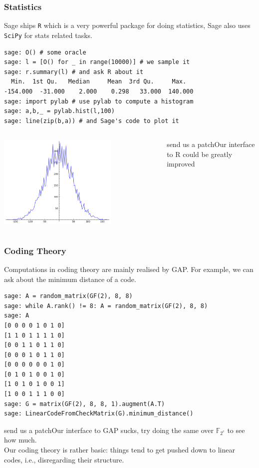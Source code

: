 \documentclass[9pt]{beamer}
\newcommand{\field}[1]{\ensuremath{\mathbb{#1}}}
\newcommand{\F}{\ensuremath{\field{F}}}
\newcommand{\patchit}[1]{\begin{block}{send us a patch}#1\end{block}}
\begin{document}
\begin{frame}[fragile]
\frametitle{Statistics}
Sage ships {\tt R} which is a very powerful package for doing statistics, Sage also uses {\tt SciPy} for stats related tasks.

\begin{lstlisting}
sage: O() # some oracle
sage: l = [O() for _ in range(10000)] # we sample it
sage: r.summary(l) # and ask R about it
  Min.  1st Qu.   Median     Mean  3rd Qu.     Max.
-154.000  -31.000    2.000    0.298   33.000  140.000
sage: import pylab # use pylab to compute a histogram
sage: a,b,_ = pylab.hist(l,100)
sage: line(zip(b,a)) # and Sage's code to plot it
\end{lstlisting}

\begin{columns}
\centering
\includegraphics[width=0.7\textwidth]{gaussian.png}
\patchit{Our interface to R could be greatly improved}
\end{columns}
\end{frame}


\begin{frame}[fragile]
\frametitle{Coding Theory}
Computations in coding theory are mainly realised by GAP. For example, we can ask about the minimum distance of a code.

\begin{lstlisting}
sage: A = random_matrix(GF(2), 8, 8)
sage: while A.rank() != 8: A = random_matrix(GF(2), 8, 8)
sage: A
[0 0 0 0 1 0 1 0]
[1 1 0 1 1 1 1 0]
[0 0 1 1 0 1 1 0]
[0 0 0 1 0 1 1 0]
[0 0 0 0 0 0 1 0]
[0 1 0 1 0 0 1 0]
[1 0 1 0 1 0 0 1]
[1 0 0 1 1 1 0 0]
sage: G = matrix(GF(2), 8, 8, 1).augment(A.T)
sage: LinearCodeFromCheckMatrix(G).minimum_distance()
\end{lstlisting}

\patchit{Our interface to GAP sucks, try doing the same over $\F_{2^e}$ to see how much.\\Our coding theory is rather basic: things tend to get pushed down to linear codes, i.e., disregarding their structure.}
\end{frame}
\end{document}

